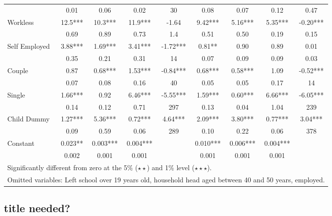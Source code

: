\begin{table}
\begin{tabular}{l|cccc|cccc}
                    	&	       0.01   	&	0.06	&	0.02	&	30	&	    
				   0.08  	&	0.07	&	0.12	&	0.47	\\
Workless	&	       12.5***	&	       10.3***	&	       11.9***	&	-1.64	&	       									9.42***	&	      5.16***	&	       5.35***	&	-0.20***	\\
	&	       0.69   	&	0.89	&	0.73	&	1.4	&	
		       0.51   	&	0.50	&	0.19	&	0.15	\\
Self Employed	&	       3.88***	&	      1.69***	&	       3.41***	&	-1.72***	&	       							0.81**	&	       0.90 &	       0.89	&	0.01	\\
	&	       0.35   	&	0.21	&	0.31	&	14	&	
		       0.07   	&	0.09	&	0.09	&	0.03	\\
Couple	&	       0.87	&	      0.68***	&	       1.53***	&	-0.84***	&	       							0.68***	&	       0.58*** &	       1.09	&	-0.52***	\\
	&	       0.07  	&	0.08	&	0.16	&	40	&	
		       0.05   	&	0.05	&	0.17	&	14	\\
Single	&	       1.66***	&	      0.92	&	       6.46***	&	-5.55***	&	       							1.59***	&	       0.60***&	      6.66*** &	-6.05***	\\
	&	       0.14   	&	0.12	&	0.71	&	297	&	
		       0.13   	&	0.04	&	1.04	&	239	\\
Child Dummy	&	       1.27***	&	      5.36***	&	      0.72***	&	4.64***	&	       							2.09***	&	       3.80*** &	       0.77***	&	3.04***	\\
	&	       0.09   	&	0.59	&	0.06	&	289	&	
		       0.10   	&	0.22	&	0.06	&	378	\\
Constant            	&	       0.023**	&	       0.003***	&	0.004***	&		&	
				       0.010***	&	       0.006***	&	       0.004***	&		\\
                    	&	       0.002   	&	0.001	&	       0.001 	&		&	 
			      0.001   	&	0.001	&	0.001	&		\\
\hline\hline
\multicolumn{9}{l}{Significantly different from zero at the 5\% ($\star\star$) and 1\% level ($\star\star\star$).} \\
\multicolumn{9}{l}{Omitted variables: Left school over 19 years old, household head aged between 40 and 50 years, employed. } 
\end{tabular}
\label{table:ahc_bhc}
\end{table}


\subsection{title needed?}

